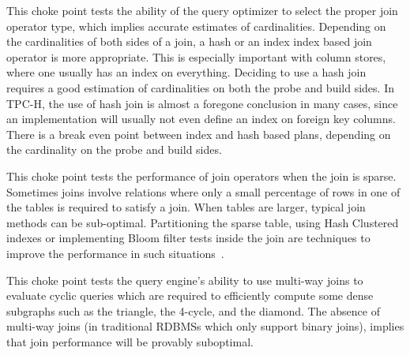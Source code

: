 



This choke point tests the ability of the query optimizer to select the proper join operator type, which implies accurate estimates of cardinalities.
Depending on the cardinalities of both sides of a join, a hash or an index index based join operator is more appropriate.
This is especially important with column stores, where one usually has an index on everything. Deciding to use a hash join requires a good estimation of cardinalities on both the probe and build sides.
In TPC-H, the use of hash join is almost a foregone conclusion in many cases, since an implementation will usually not even define an index on foreign key columns.
There is a break even point between index and hash based plans, depending on the cardinality on the probe and build sides.





This choke point tests the performance of join operators when the join is sparse. Sometimes joins involve relations where only a small percentage of rows in one of the tables is required to satisfy a join. When tables are larger, typical join methods can be sub-optimal. Partitioning the sparse table, using Hash Clustered indexes or implementing Bloom filter tests inside the join are techniques to improve the performance in such situations~\cite{DBLP:journals/csur/Graefe93}.





This choke point tests the query engine's ability to use multi-way joins to evaluate cyclic queries which are required to efficiently compute some dense subgraphs such as the triangle, the 4-cycle, and the diamond. The absence of multi-way joins (\eg in traditional RDBMSs which only support binary joins), implies that join performance will be provably suboptimal.



